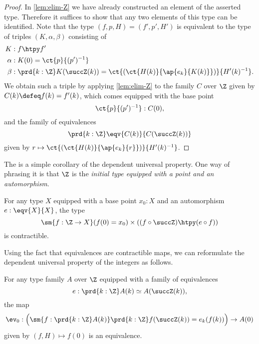 \begin{proof}
  In \cref{lem:elim-Z} we have already constructed an element of the asserted type.
  Therefore it suffices to show that any two elements of this type can be identified.
  Note that the type $(f,p,H)=(f',p',H')$ is equivalent to the type of triples $(K,\alpha,\beta)$ consisting of
  \begin{align*}
    K & : f\htpy f' \\
    \alpha & : K(0)=\ct{p}{(p')^{-1}} \\
    \beta & : \prd{k:\Z}K(\succZ (k))=\ct{(\ct{H(k)}{\ap{e_k}{K(k)}})}{H'(k)^{-1}}.
  \end{align*}
  We obtain such a triple by applying \cref{lem:elim-Z} to the family $C$ over $\Z$ given by $C(k)\defeq f(k)=f'(k)$, which comes equipped with the base point
  \begin{equation*}
    \ct{p}{(p')^{-1}} : C(0),
  \end{equation*}
  and the family of equivalences
  \begin{equation*}
    \prd{k:\Z}\eqv{C(k)}{C(\succZ (k))}
  \end{equation*}
  given by $r\mapsto \ct{(\ct{H(k)}{\ap{e_k}{r}})}{H'(k)^{-1}}$.
\end{proof}

The  is a simple corollary of the dependent universal property. One way of phrasing it is that $\Z$ is the \emph{initial type equipped with a point and an automorphism}.

\begin{cor}
  For any type $X$ equipped with a base point $x_0:X$ and an automorphism $e:\eqv{X}{X}$, the type
  \begin{equation*}
    \sm{f:\Z\to X}(f(0)=x_0)\times ((f \circ \succZ )\htpy(e\circ f))
  \end{equation*}
  is contractible.
\end{cor}

Using the fact that equivalences are contractible maps, we can reformulate the dependent universal property of the integers as follows.

\begin{thm}
  For any type family $A$ over $\Z$ equipped with a family of equivalences
  \begin{equation*}
    e:\prd{k:\Z}A(k)\simeq A(\succZ(k)),
  \end{equation*}
  the map
  \begin{equation*}
    \ev_0:\Big(\sm{f:\prd{k:\Z}A(k)}\prd{k:\Z}f(\succZ(k))=e_k(f(k))\Big)\to A(0)
  \end{equation*}
  given by $(f,H)\mapsto f(0)$ is an equivalence.
\end{thm}

